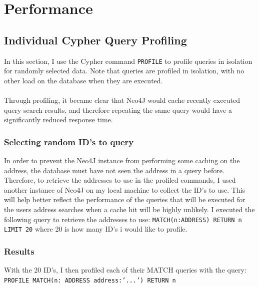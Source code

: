\section{Performance} 
\subsection{Individual Cypher Query Profiling}
In this section, I use the Cypher command \texttt{PROFILE} to profile queries in isolation for randomly selected data. Note that queries are profiled in isolation, with no other load on the database when they are executed. 
\\\\
Through profiling, it became clear that Neo4J would cache recently executed query search results, and therefore repeating the same query would have a significantly reduced response time. 

\subsubsection{Selecting random ID's to query}
In order to prevent the Neo4J instance from performing some caching on the address, the database must have not seen the address in a query before. Therefore, to retrieve the addresses to use in the profiled commands, I used another instance of Neo4J on my local machine to collect the ID's to use. This will help better reflect the performance of the queries that will be executed for the users address searches when a cache hit will be highly unlikely. I executed the following query to retrieve the addresses to use: \texttt{MATCH(n:ADDRESS) RETURN n LIMIT 20} where 20 is how many ID's i would like to profile. 

\subsubsection{Results}

With the 20 ID's, I then profiled each of their MATCH queries with the query:
\texttt{PROFILE MATCH(n: ADDRESS {address:'...'}) RETURN n}

